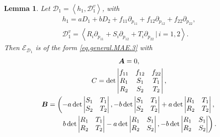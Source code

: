 \documentclass[pdftex]{sigma}
\newcommand{\R}{\mathbb{R}}
\newcommand{\D}{\mathcal{D}}
\newcommand{\E}{\mathcal{E}}
\newcommand{\Span}[1]{\left\langle #1 \right\rangle}
\numberwithin{equation}{section}
\newtheorem{Lemma}[Theorem]{Lemma}
\begin{document}
\begin{Lemma}\label{LemEd1QLMonge}
 Let $\D_1=\Span{h_1,\D_1^v}$, with
\begin{gather*}
h_1 = aD_1+bD_2+f_{11}\partial_{p_{11}}+f_{12}\partial_{p_{12}}+f_{22}\partial_{p_{22}},%
\\
\D_1^v = \Span{R_i\partial_{p_{11}}+S_i\partial_{p_{12}}+T_i\partial_{p_{22}}\,|\, i=1,2}.%
\end{gather*}
Then $\E_{\D_1}$ is of the form \eqref{eq.general.MAE.3} with
\begin{gather}
\boldsymbol{A} = 0,\label{condA}\\
C = \det \left|\begin{matrix}f_{11} & f_{12} & f_{22} \\R_1 & S_1 & T_1 \\R_2 & S_2 & T_2\end{matrix}\right|,\label{condC}\\
\boldsymbol{B} = \left(-a \det\left|\begin{matrix}S_1 & T_1 \\S_2 & T_2\end{matrix} \right| , -b \det\left|\begin{matrix}S_1 & T_1 \\S_2 & T_2\end{matrix}\right| +a \det\left|\begin{matrix}R_1 & T_1 \\R_2 & T_2\end{matrix}\right| ,\right.\nonumber\\
\left. \hphantom{\boldsymbol{B} =}{} \quad
 b \det\left|\begin{matrix}R_1 & T_1 \\R_2 & T_2\end{matrix}\right| - a \det\left|\begin{matrix}R_1 & S_1 \\R_2 & S_2\end{matrix}\right|, -b \det\left|\begin{matrix}R_1 & S_1 \\R_2 & S_2\end{matrix}\right| \right).\label{condB}
\end{gather}
\end{Lemma}
\end{document}
